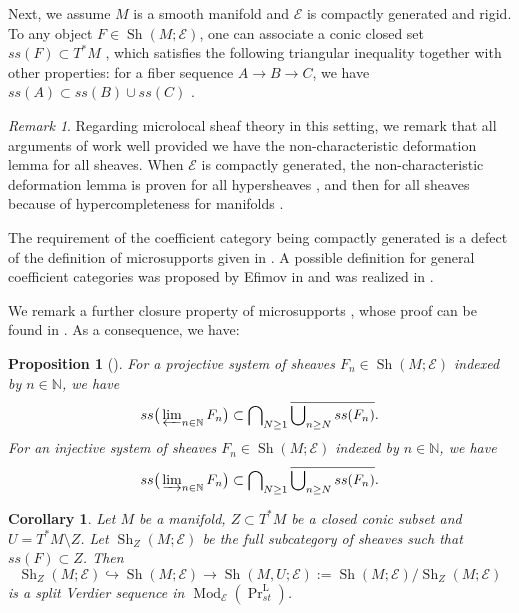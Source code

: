 \documentclass[11pt]{amsart}
\numberwithin{equation}{section}
\theoremstyle{plain}
\newtheorem{Prop}[prop]{Proposition}
\newtheorem{Coro}[coro]{Corollary}
\theoremstyle{definition}
\theoremstyle{remark}
\newtheorem{RMK}[rmk]{Remark}
\newcommand{\bN} { {\mathbb{N}}}
\newcommand{\cE} { {\mathcal{E}}}
\newcommand{\Mod}{{\operatorname{Mod}}}
\newcommand{\Sh} { {\operatorname{Sh}}}
\newcommand\PrLst{  {  \operatorname{Pr}^{\operatorname{L} }_{st} } }
\begin{document}
Next, we assume $M$ is a smooth manifold and $\cE$ is compactly generated and rigid. 
To any object $F \in \Sh(M; \cE)$, one can associate a conic closed set $ss(F) \subset T^*M$ {\cite[Definition 5.1.2]{KS90}}, which satisfies the following triangular inequality together with other properties: for a fiber sequence $A \rightarrow B \rightarrow C$, we have $ss(A) \subset ss(B) \cup ss(C)$ \cite[Proposition~5.1.3]{KS90}.

\begin{RMK}Regarding microlocal sheaf theory in this setting, we remark that all arguments of \cite{KS90} work well provided we have the non-characteristic deformation lemma \cite[Proposition 2.7.2]{KS90} for all sheaves. When $\cE$ is compactly generated, the non-characteristic deformation lemma is proven for all hypersheaves \cite{Amicrolocallemma_infinitycat}, and then for all sheaves because of hypercompleteness for manifolds \cite[Thm.~7.2.3.6, Coro.~7.2.1.12]{HTT}.

The requirement of the coefficient category being compactly generated is a defect of the definition of microsupports given in \cite{KS90}. A possible definition for general coefficient categories was proposed by Efimov in \cite[Remark 4.24]{Efimov-K-theory} and was realized in \cite{Zhang_K_Remark}.    
\end{RMK}

We remark a further closure property of microsupports \cite[Exercise V.7]{KS90}, whose proof can be found in \cite[Proposition~3.4]{guillermouviterbo_gammasupport}. As a consequence, we have:


\begin{Prop}[{\cite[Proposition~6.26]{guillermouviterbo_gammasupport}}]\label{cor:sheaf-bicomplete}
For a projective system of sheaves $F_n\in \Sh(M;\cE)$ indexed by $n \in \bN$, we have 
\[ss\big(\varprojlim\nolimits_{n\in \bN}F_n\big) \subset \bigcap\nolimits_{N \geq 1}\overline{\bigcup\nolimits_{n\geq N} ss(F_n)}.\]
For an injective system of sheaves $F_n\in \Sh(M;\cE)$ indexed by $n \in \bN$, we have 
\[ss\big(\varinjlim\nolimits_{n\in \bN}F_n\big) \subset \bigcap\nolimits_{N \geq 1}\overline{\bigcup\nolimits_{n\geq N} ss(F_n)}.\]
\end{Prop}

\begin{Coro}\label{cor:split-verider-topology-sheaf}
Let $M$ be a manifold, $Z \subset T^*M$ be a closed conic subset and $U = T^*M \setminus Z$. Let $\Sh_Z(M; \cE)$ be the full subcategory of sheaves such that $ss(F) \subset Z$. Then 
\[\Sh_Z(M; \cE) \hookrightarrow \Sh(M; \cE) \rightarrow \Sh(M, U; \cE) := \Sh(M; \cE) / \Sh_Z(M; \cE)\]
is a split Verdier sequence in $\Mod_\cE(\PrLst)$.
\end{Coro}
\end{document}
